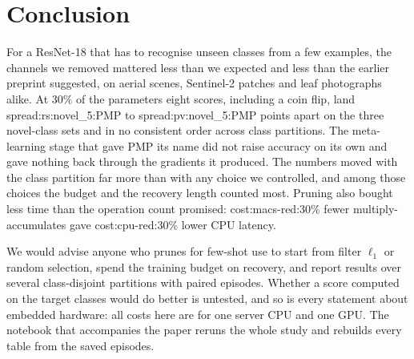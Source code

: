 \section{Conclusion}
\label{sec:conclusion}

For a ResNet-18 that has to recognise unseen classes from a few examples, the channels we removed mattered less than we expected and less than the earlier preprint suggested, on aerial scenes, Sentinel-2 patches and leaf photographs alike. At $30\%$ of the parameters eight scores, including a coin flip, land \num{spread:rs:novel_5:PMP} to \num{spread:pv:novel_5:PMP} points apart on the three novel-class sets and in no consistent order across class partitions. The meta-learning stage that gave PMP its name did not raise accuracy on its own and gave nothing back through the gradients it produced. The numbers moved with the class partition far more than with any choice we controlled, and among those choices the budget and the recovery length counted most. Pruning also bought less time than the operation count promised: \num{cost:macs-red:30}\% fewer multiply-accumulates gave \num{cost:cpu-red:30}\% lower CPU latency.

We would advise anyone who prunes for few-shot use to start from filter $\ell_1$ or random selection, spend the training budget on recovery, and report results over several class-disjoint partitions with paired episodes. Whether a score computed on the target classes would do better is untested, and so is every statement about embedded hardware: all costs here are for one server CPU and one GPU. The notebook that accompanies the paper reruns the whole study and rebuilds every table from the saved episodes.
